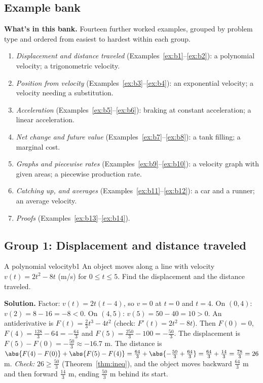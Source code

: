 \documentclass[11pt]{article}
\begin{document}
\subsection*{Example bank}

\textbf{What's in this bank.} Fourteen further worked examples, grouped by problem type and ordered from easiest to hardest within each group.
\begin{enumerate}[nosep]
  \item \emph{Displacement and distance traveled} (Examples~\ref{ex:b1}--\ref{ex:b2}): a polynomial velocity; a trigonometric velocity.
  \item \emph{Position from velocity} (Examples~\ref{ex:b3}--\ref{ex:b4}): an exponential velocity; a velocity needing a substitution.
  \item \emph{Acceleration} (Examples~\ref{ex:b5}--\ref{ex:b6}): braking at constant acceleration; a linear acceleration.
  \item \emph{Net change and future value} (Examples~\ref{ex:b7}--\ref{ex:b8}): a tank filling; a marginal cost.
  \item \emph{Graphs and piecewise rates} (Examples~\ref{ex:b9}--\ref{ex:b10}): a velocity graph with given areas; a piecewise production rate.
  \item \emph{Catching up, and averages} (Examples~\ref{ex:b11}--\ref{ex:b12}): a car and a runner; an average velocity.
  \item \emph{Proofs} (Examples~\ref{ex:b13}--\ref{ex:b14}).
\end{enumerate}

\subsection*{Group 1: Displacement and distance traveled}

\begin{exmp}{A polynomial velocity}{b1}
An object moves along a line with velocity $v(t)=2t^2-8t$ (m/s) for $0\le t\le5$. Find the displacement and the distance traveled.

\textbf{Solution.} Factor: $v(t)=2t(t-4)$, so $v=0$ at $t=0$ and $t=4$. On $(0,4)$: $v(2)=8-16=-8<0$. On $(4,5)$: $v(5)=50-40=10>0$. An antiderivative is $F(t)=\frac23t^3-4t^2$ (check: $F'(t)=2t^2-8t$).
Then $F(0)=0$, $F(4)=\frac{128}3-64=-\frac{64}3$ and $F(5)=\frac{250}3-100=-\frac{50}3$. The displacement is $F(5)-F(0)=-\frac{50}3\approx-16.7$ m. The distance is $\abs{F(4)-F(0)}+\abs{F(5)-F(4)}=\frac{64}3+\abs{-\frac{50}3+\frac{64}3}=\frac{64}3+\frac{14}3=\frac{78}3=26$ m.
\emph{Check:} $26\ge\frac{50}3$ (Theorem~\ref{thm:ineq}), and the object moves backward $\frac{64}3$ m and then forward $\frac{14}3$ m, ending $\frac{50}3$ m behind its start.
\end{exmp}
\end{document}
